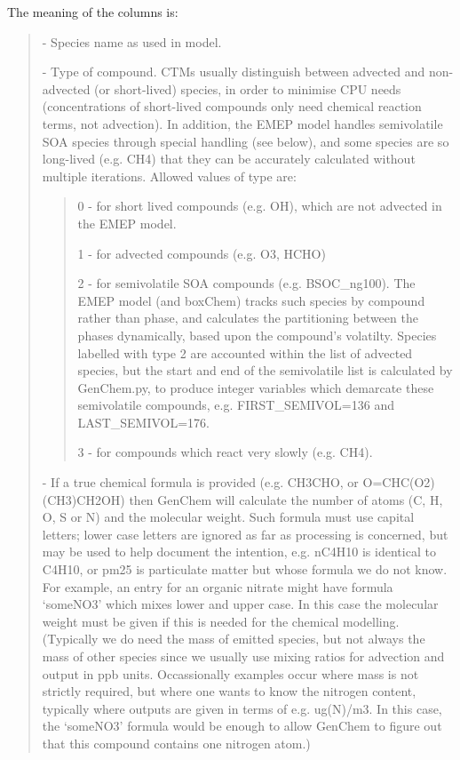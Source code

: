 \documentclass[a4paper,10pt,english]{sphinxmanual}
\begin{document}
The meaning of the columns is:
\begin{quote}

 -  Species name as used in model.

 -   Type of compound. CTMs usually distinguish between advected and
non-advected (or short-lived) species, in order to minimise CPU needs
(concentrations of short-lived compounds only need chemical reaction
terms, not advection). In addition, the EMEP model handles semivolatile
SOA species  through special handling (see below), and some
species are so long-lived (e.g. CH4) that they can be accurately
calculated without multiple iterations.  Allowed values of type are:
\begin{quote}

0 - for short lived compounds (e.g. OH), which are not advected in the EMEP model.

1 - for advected compounds (e.g. O3, HCHO)

2 - for semivolatile SOA compounds (e.g. BSOC\_ng100). The EMEP model (and boxChem)
tracks such species by compound rather than phase, and calculates
the partitioning between the phases dynamically, based upon the
compound’s volatilty. Species labelled with
type 2 are accounted within the list of advected species, but the
start and end of the  semivolatile list is calculated by GenChem.py,
to produce integer variables which demarcate these semivolatile
compounds, e.g. FIRST\_SEMIVOL=136  and LAST\_SEMIVOL=176.

3 - for compounds which react very slowly (e.g. CH4).
\end{quote}

 -  If a true chemical formula is provided (e.g. CH3CHO, or
O=CHC(O2)(CH3)CH2OH) then GenChem will calculate the number of atoms
(C, H, O, S or N) and the molecular weight. Such formula must use
capital letters; lower case letters are ignored as far as processing is
concerned, but may be used to help document the intention, e.g. nC4H10
is identical to C4H10, or pm25 is particulate matter but whose formula
we do not know. For example, an entry for an organic nitrate might have
formula ‘someNO3’ which mixes lower and upper case.  In this case
the molecular weight must be given if this is needed for the chemical
modelling. (Typically we do need the mass of emitted species, but not
always the mass of other species since we usually use mixing ratios
for advection and output in ppb units.  Occassionally examples occur
where mass is not strictly required, but where one wants to know
the nitrogen content, typically where outputs are given in terms of
e.g. ug(N)/m3. In this case, the ‘someNO3’ formula would be
enough to allow GenChem to figure out that this compound contains one
nitrogen atom.)


\end{quote}
\end{document}
